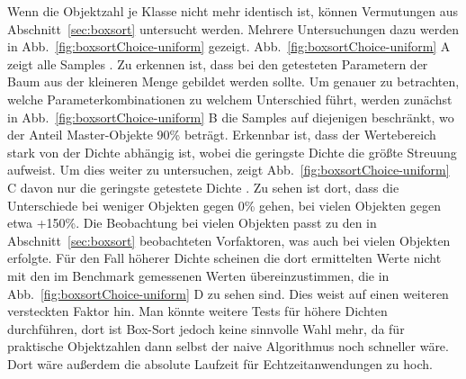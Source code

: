Wenn die Objektzahl je Klasse nicht mehr identisch ist, können Vermutungen aus Abschnitt~\ref{sec:boxsort} untersucht werden.
Mehrere Untersuchungen dazu werden in Abb.~\ref{fig:boxsortChoice-uniform} gezeigt. Abb.~\ref{fig:boxsortChoice-uniform} A zeigt alle Samples
. Zu erkennen ist, dass bei den getesteten Parametern der Baum aus der kleineren Menge gebildet werden sollte. Um genauer zu betrachten, welche Parameterkombinationen zu welchem Unterschied führt, werden zunächst in Abb.~\ref{fig:boxsortChoice-uniform} B die Samples auf diejenigen beschränkt, wo der Anteil Master-Objekte 90\% beträgt. 
Erkennbar ist, dass der Wertebereich stark von der Dichte abhängig ist, wobei die geringste Dichte die größte
 Streuung aufweist. Um dies weiter zu untersuchen, zeigt Abb.~\ref{fig:boxsortChoice-uniform} C davon nur die geringste getestete Dichte
. Zu sehen ist dort, dass die Unterschiede bei weniger Objekten gegen 0\% gehen, bei vielen Objekten gegen etwa +150\%. Die Beobachtung bei vielen Objekten passt zu den in Abschnitt~\ref{sec:boxsort} beobachteten Vorfaktoren, was auch bei vielen Objekten erfolgte. Für den Fall höherer Dichte scheinen die dort ermittelten Werte nicht mit den im Benchmark gemessenen Werten übereinzustimmen, die in Abb.~\ref{fig:boxsortChoice-uniform} D zu sehen sind. Dies weist auf einen weiteren versteckten Faktor hin. Man könnte weitere Tests für höhere Dichten durchführen, dort ist Box-Sort jedoch keine sinnvolle Wahl mehr, da für praktische Objektzahlen dann selbst der naive Algorithmus noch schneller wäre. Dort wäre außerdem die absolute Laufzeit für Echtzeitanwendungen zu hoch.\\

